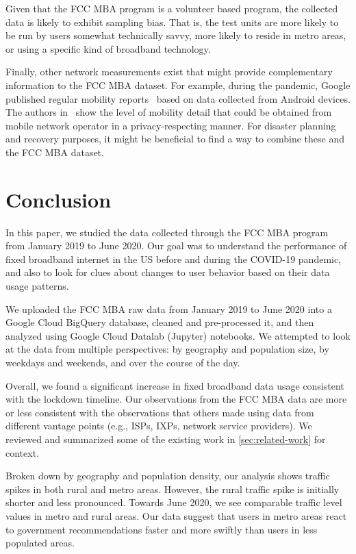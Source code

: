 \documentclass[conference,10pt]{IEEEtran}
\begin{document}
Given that the \gls{FCC} \gls{MBA} program is a volunteer based program, the collected data is likely to exhibit sampling bias. That is, the test units are more likely to be run by users somewhat technically savvy, more likely to reside in metro areas, or using a specific kind of broadband technology.

Finally, other network measurements exist that might provide complementary information to the \gls{FCC} \gls{MBA} dataset. For example, during the pandemic, Google published regular mobility reports~\cite{google-mobility-report} based on data collected from Android devices. The authors in~\cite{lutu2020characterization} show the level of mobility detail that could be obtained from mobile network operator in a privacy-respecting manner. For disaster planning and recovery purposes, it might be beneficial to find a way to combine these and the \gls{FCC} \gls{MBA} dataset.

\section{Conclusion}\label{sec:conclusion}

In this paper, we studied the data collected through the \gls{FCC} \gls{MBA} program from January 2019 to June 2020. Our goal was to understand the performance of fixed broadband internet in the \gls{US} before and during the COVID-19 pandemic, and also to look for clues about changes to user behavior based on their data usage patterns.

We uploaded the \gls{FCC} \gls{MBA} raw data from January 2019 to June 2020 into a Google Cloud BigQuery database, cleaned and pre-processed it, and then analyzed using Google Cloud Datalab (Jupyter) notebooks. We attempted to look at the data from multiple perspectives: by geography and population size, by weekdays and weekends, and over the course of the day.

Overall, we found a significant increase in fixed broadband data usage consistent with the lockdown timeline. Our observations from the \gls{FCC} \gls{MBA} data are more or less consistent with the observations that others made using data from different vantage points (e.g., \glspl{ISP}, \glspl{IXP}, network service providers). We reviewed and summarized some of the existing work in \cref{sec:related-work} for context.

Broken down by geography and population density, our analysis shows traffic spikes in both rural and metro areas. However, the rural traffic spike is initially shorter and less pronounced. Towards June 2020, we see comparable traffic level values in metro and rural areas. Our data suggest that users in metro areas react to government recommendations faster and more swiftly than users in less populated areas.
\end{document}
